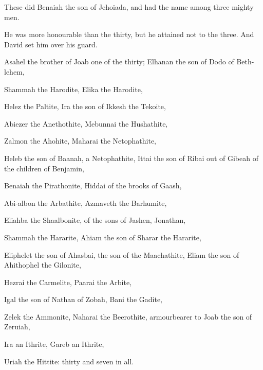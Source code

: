{These
{}
did
Benaiah the
son of
Jehoiada, and had the
name among
three mighty
men.

He was more
honourable than the
thirty, but he
attained not to the
{}
three. And
David
set him over his
guard.

Asahel the
brother of
Joab
{} one of the
thirty;
Elhanan the
son of
Dodo of
Beth-lehem,

Shammah the
Harodite,
Elika the
Harodite,

Helez the
Paltite,
Ira the
son of
Ikkesh the
Tekoite,

Abiezer the
Anethothite,
Mebunnai the
Hushathite,

Zalmon the
Ahohite,
Maharai the
Netophathite,

Heleb the
son of
Baanah, a
Netophathite,
Ittai the
son of
Ribai out of
Gibeah of the
children of
Benjamin,

Benaiah the
Pirathonite,
Hiddai of the
brooks of
Gaash,

Abi-albon the
Arbathite,
Azmaveth the
Barhumite,

Eliahba the
Shaalbonite, of the
sons of
Jashen,
Jonathan,

Shammah the
Hararite,
Ahiam the
son of
Sharar the
Hararite,

Eliphelet the
son of
Ahasbai, the
son of the
Maachathite,
Eliam the
son of
Ahithophel the
Gilonite,

Hezrai the
Carmelite,
Paarai the
Arbite,

Igal the
son of
Nathan of
Zobah,
Bani the
Gadite,

Zelek the
Ammonite,
Naharai the
Beerothite,
armourbearer to
Joab the
son of
Zeruiah,

Ira an
Ithrite,
Gareb an
Ithrite,

Uriah the
Hittite:
thirty and
seven in all.




\par }
